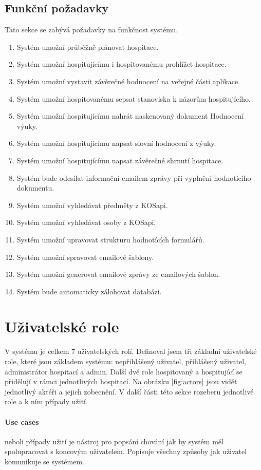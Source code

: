 \subsection{Funkční požadavky}
Tato sekce se zabývá požadavky na funkčnost systému.
\begin{enumerate}
\item Systém umožní průběžně plánovat hospitace.
\item Systém umožní hospitujícímu i hospitovanému prohlížet hospitace.
\item Systém umožní vystavit závěrečné hodnocení na veřejné části aplikace. 
\item Systém umožní hospitovanému sepsat stanoviska k názorům hospitujícího.
\item Systém umožní hospitujícímu nahrát naskenovaný dokument Hodnocení výuky.
\item Systém umožní hospitujícímu napsat slovní hodnocení z výuky.
\item Systém umožní hospitujícímu napsat závěrečné shrnutí hospitace.
\item Systém bude odesílat informační emailem zprávy při vyplnění hodnotícího dokumentu.
\item Systém umožní vyhledávat předměty z KOSapi.
\item Systém umožní vyhledávat osoby z KOSapi.
\item Systém umožní upravovat strukturu hodnotících formulářů.
\item Systém umožní spravovat emailové šablony.
\item Systém umožní generovat emailové zprávy ze emailových šablon.
\item Systém bude automaticky zálohovat databázi.
\end{enumerate}

\section{Uživatelské role}
V systému je celkem 7 uživatelských rolí. Definoval jsem tři základní uživatelské role, které jsou základem systému: nepřihlášený uživatel, přihlášený uživatel, administrátor hospitací a admin. Další dvě role hospitovaný a hospitující se přidělují v rámci jednotlivých hospitací. Na obrázku \ref{fig:actors} jsou vidět jednotlivý aktéři a jejich zobecnění. V další části této sekce rozeberu jednotlivé role a k ním případy užití.

\paragraph*{Use cases}
neboli případy užití je nástroj pro popsání chování jak by systém měl spolupracovat s koncovým uživatelem. Popisuje všechny způsoby jak uživatel komunikuje se systémem.


